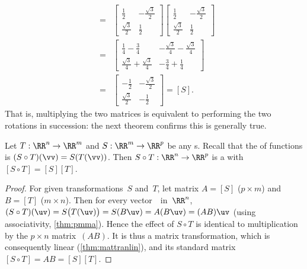 \begin{example}
\begin{solution}
\begin{eqnarray*}
[R][R]
&=&\begin{bmatrix} \frac12&-\frac{\sqrt3}2
\\\frac{\sqrt3}2&\frac12 \end{bmatrix}\begin{bmatrix} \frac12&-\frac{\sqrt3}2
\\\frac{\sqrt3}2&\frac12 \end{bmatrix}
\\&=&\begin{bmatrix} \tfrac14-\tfrac34 & -\tfrac{\sqrt3}4-\tfrac{\sqrt3}4
\\ \tfrac{\sqrt3}4+\tfrac{\sqrt3}4 & -\tfrac34+\tfrac14\end{bmatrix}
\\&=&\begin{bmatrix} -\frac12&-\frac{\sqrt3}2
\\\frac{\sqrt3}2&-\frac12 \end{bmatrix}=[S].
\end{eqnarray*}
That is, multiplying the two matrices is equivalent to performing the two rotations in succession: the next theorem confirms this is generally true.
\end{solution}
\end{example}





\begin{theorem} \label{thm:stmatcomp} 
Let \(T:\RR^n\to\RR^m\) and \(S:\RR^m\to\RR^p\) be any s.  
Recall that the  of functions is \((S\circ T)(\vv)=S(T(\vv))\). 
Then \(S\circ T:\RR^n\to\RR^p\) is a  with  \([S\circ T]=[S][T]\).
\end{theorem}

\begin{proof} 
For given transformations~\(S\) and~\(T\), let matrix \(A=[S]\) (\(p\times m\)) and \(B=[T]\) (\(m\times n\)).
Then for every vector~\uv\ in~\(\RR^n\), 
\((S\circ T)(\uv)
=S\big(T(\uv)\big)
=S(B\uv)
=A(B\uv)
=(AB)\uv\) (using associativity, \cref{thm:pmma}).
Hence the effect of \(S\circ T\) is identical to multiplication by the  \(p\times n\) matrix~\((AB)\).
It is thus a matrix transformation, which is consequently linear (\cref{thm:mattranlin}), and its standard matrix \([S\circ T]=AB=[S][T]\).
\end{proof}


